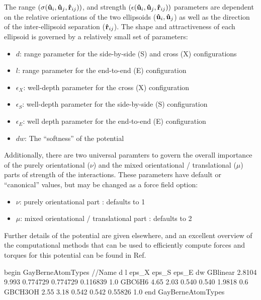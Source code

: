\documentclass[]{book}
\begin{document}
The range $(\sigma({\bf \hat{u}}_{i},{\bf \hat{u}}_{j},{\bf
\hat{r}}_{ij}))$, and strength $(\epsilon({\bf \hat{u}}_{i},{\bf
\hat{u}}_{j},{\bf \hat{r}}_{ij}))$ parameters 
are dependent on the relative orientations of the two ellipsoids (${\bf
\hat{u}}_{i},{\bf \hat{u}}_{j}$) as well as the direction of the
inter-ellipsoid separation (${\bf \hat{r}}_{ij}$).  The shape and
attractiveness of each ellipsoid is governed by a relatively small set
of parameters: 
\begin{itemize}
\item  $d$:  range parameter for the side-by-side (S) and cross (X) configurations
\item  $l$:  range parameter for the end-to-end (E) configuration
\item  $\epsilon_X$:  well-depth parameter for the cross (X) configuration
\item  $\epsilon_S$:  well-depth parameter for the side-by-side (S) configuration
\item  $\epsilon_E$:  well depth parameter for the end-to-end (E) configuration
\item  $dw$: The ``softness'' of the potential
\end{itemize}
Additionally, there are two universal paramters to govern the overall
importance of the purely orientational ($\nu$) and the mixed
orientational / translational ($\mu$) parts of strength of the
interactions.  These parameters have default or ``canonical'' values,
but may be changed as a force field option:
\begin{itemize}
  \item $\nu$: purely orientational part : defaults to 1
  \item $\mu$: mixed orientational / translational part : defaults to
    2
\end{itemize}
Further details of the potential are given
elsewhere,\cite{Luckhurst:1990fy,Golubkov06,SunX._jp0762020} and an
excellent overview of the computational methods that can be used to
efficiently compute forces and torques for this potential can be found
in Ref. \citealp{Golubkov06}

\begin{code}[caption={[An example of a GayBerneAtomTypes block.] A
simple example of a GayBerneAtomTypes block.  Distances ($d$ and $l$)
are given in \AA\ and energies ($\epsilon_X, \epsilon_S, \epsilon_E$)
are in units of kcal/mol. $dw$ is unitless.},
label={sch:GayBerneAtomTypes}]
begin GayBerneAtomTypes
//Name          d       l       eps_X           eps_S           eps_E     dw
GBlinear        2.8104  9.993   0.774729        0.774729        0.116839  1.0
GBC6H6          4.65    2.03    0.540           0.540           1.9818    0.6
GBCH3OH         2.55    3.18    0.542           0.542           0.55826   1.0
end GayBerneAtomTypes                   
\end{code}
\end{document}
